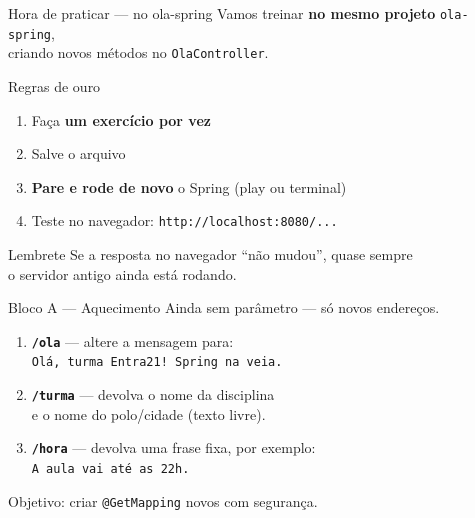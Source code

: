 \documentclass[aspectratio=169,11pt]{beamer}
\begin{document}
\begin{frame}{Hora de praticar --- no ola-spring}
  Vamos treinar \textbf{no mesmo projeto} \texttt{ola-spring},\\
  criando novos métodos no \texttt{OlaController}.

  \vspace{0.6em}
  \begin{block}{Regras de ouro}
    \begin{enumerate}
      \item Faça \textbf{um exercício por vez}
      \item Salve o arquivo
      \item \textbf{Pare e rode de novo} o Spring (play ou terminal)
      \item Teste no navegador: \texttt{http://localhost:8080/...}
    \end{enumerate}
  \end{block}

  \vspace{0.4em}
  \begin{alertblock}{Lembrete}
    Se a resposta no navegador ``não mudou'', quase sempre\\
    o servidor antigo ainda está rodando.
  \end{alertblock}
\end{frame}

\begin{frame}{Bloco A --- Aquecimento}
  Ainda sem parâmetro --- só novos endereços.

  \vspace{0.4em}
  \begin{enumerate}
    \item \textbf{\texttt{/ola}} --- altere a mensagem para:\\
          \texttt{Olá, turma Entra21! Spring na veia.}
    \item \textbf{\texttt{/turma}} --- devolva o nome da disciplina\\
          e o nome do polo/cidade (texto livre).
    \item \textbf{\texttt{/hora}} --- devolva uma frase fixa, por exemplo:\\
          \texttt{A aula vai até as 22h.}
  \end{enumerate}

  \vspace{0.6em}
  Objetivo: criar \texttt{@GetMapping} novos com segurança.
\end{frame}
\end{document}
